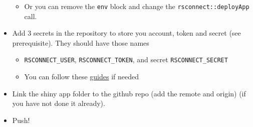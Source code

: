 \documentclass[
]{book}
\newenvironment{Shaded}{\begin{snugshade}}{\end{snugshade}}
\newcommand{\AttributeTok}[1]{\textcolor[rgb]{0.77,0.63,0.00}{#1}}
\newcommand{\CharTok}[1]{\textcolor[rgb]{0.31,0.60,0.02}{#1}}
\newcommand{\FunctionTok}[1]{\textcolor[rgb]{0.00,0.00,0.00}{#1}}
\newcommand{\KeywordTok}[1]{\textcolor[rgb]{0.13,0.29,0.53}{\textbf{#1}}}
\newcommand{\NormalTok}[1]{#1}
\providecommand{\tightlist}{%
  \setlength{\itemsep}{0pt}\setlength{\parskip}{0pt}}
\begin{document}
\begin{itemize}
  \begin{itemize}
  \tightlist
  \item
    Or you can remove the \texttt{env} block and change the \texttt{rsconnect::deployApp} call.
  \end{itemize}

\begin{Shaded}
\end{Shaded}
\item
  Add 3 secrets in the repository to store you account, token and secret (see prerequisite). They should have those names

  \begin{itemize}
  \tightlist
  \item
    \texttt{RSCONNECT\_USER}, \texttt{RSCONNECT\_TOKEN}, and secret \texttt{RSCONNECT\_SECRET}
  \item
    You can follow these \href{https://docs.github.com/en/actions/security-guides/encrypted-secrets\#creating-encrypted-secrets-for-a-repository}{guides} if needed
  \end{itemize}
\item
  Link the shiny app folder to the github repo (add the remote and origin) (if you have not done it already).
\item
  Push!
\end{itemize}

  
\end{document}
